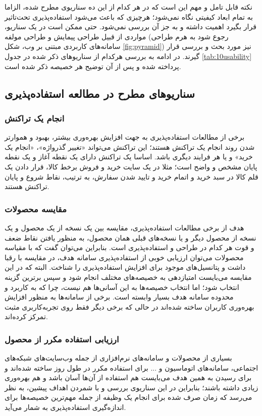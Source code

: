 نکته قابل تامل و مهم این است که در هر کدام از این ده سناریوی مطرح شده، الزاما به تمام ابعاد کیفیتی نگاه نمی‌شود؛ هرچیزی که باعث می‌شود استفاده‌پذیری تحت‌تاثیر قرار بگیرد اهمیت داشته و به جز آن بررسی نمی‌شود. حتی ممکن است در یک سناریو، مواردی از قبیل طراحی پیمایش و طراحی مولفه (رجوع شود به هرم طراحی سامانه‌های کاربردی مبتنی بر وب، شکل \ref{fig:pyramid}) نیز مورد بحث و بررسی قرار گیرند. در ادامه به بررسی هرکدام از سناریوهای ذکر شده در جدول
\ref{tab:10usability}
پرداخته شده و پس از آن توضیح هر خصیصه ذکر شده است.
\subsection{سناریو‌های مطرح در مطالعه استفاده‌پذیری}
\subsubsection{انجام یک تراکنش}
برخی از مطالعات استفاده‌پذیری به جهت افزایش بهره‌وری بیشتر، بهبود و هموارتر شدن روند انجام یک تراکنش هستند؛ این تراکنش می‌تواند «تغییر گذرواژه»، «انجام یک خرید» و یا هر فرایند دیگری باشد. اساسا یک تراکنش دارای یک نقطه آغاز و یک نقطه پایان مشخص و واضح است؛ مثلا در یک سایت خرید و فروش برخط کالا، قرار دادن یک قلم کالا در سبد خرید و اتمام خرید و تایید شدن سفارش، به ترتیب، نقاط شروع و پایان تراکنش هستند.
\subsubsection{مقایسه محصولات}
هدف از برخی مطالعات استفاده‌پذیری، مقایسه بین یک نسخه از یک محصول و یک نسخه از محصول دیگر و یا نسخه‌های قبلی همان محصول، به منظور یافتن نقاط ضعف و قوت هر کدام در طراحی و استفاده‌پذیری است. بنابراین می‌توان گفت که با مقیاسه محصولات می‌توان ارزیابی خوبی از استفاده‌پذیری سامانه هدف، در مقایسه با رقبا داشت و پتانسیل‌های موجود برای افزایش استفاده‌پذیری را شناخت. البته که در این مقایسه می‌بایست امتیازدهی به خصیصه‌های مختلف انجام شود و سپس برترین گزینه انتخاب شود؛ اما انتخاب خصیصه‌ها به این آسانی‌ها هم نیست، چرا که به کاربرد و محدوده سامانه هدف بسیار وابسته‌ است. برخی از سامانه‌ها به منظور افزایش بهره‌وری کاربران ساخته شده‌اند در حالی که برخی دیگر فقط روی تجربه‌کاربری مثبت تمرکز کرده‌اند.
\subsubsection{ارزیابی استفاده مکرر از محصول}
بسیاری از محصولات و سامانه‌های نرم‌افزاری از جمله وب‌سایت‌های شبکه‌های اجتماعی، سامانه‌های اتوماسیون و ... برای استفاده مکرر در طول روز ساخته شده‌اند و برای رسیدن به همین هدف می‌بایست هم استفاده از آن‌ها آسان باشد و هم بهره‌وری زیادی داشته باشند؛ بنابراین در این سناریوی بررسی و با شمردن اهداف پیشین، به نظر می‌رسد که زمان صرف شده برای انجام یک وظیفه از جمله مهم‌ترین خصیصه‌ها برای اندازه‌گیری استفاده‌پذیری به شمار می‌آید.
